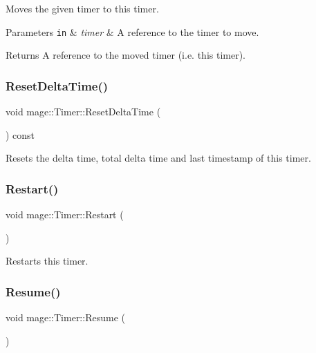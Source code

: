 Moves the given timer to this timer.


\begin{DoxyParams}[1]{Parameters}
\mbox{\tt in}  & {\em timer} & A reference to the timer to move. \\
\hline
\end{DoxyParams}
\begin{DoxyReturn}{Returns}
A reference to the moved timer (i.\+e. this timer). 
\end{DoxyReturn}
\hypertarget{classmage_1_1_timer_af9f185515128afd02ff36ac36f665552}{}\label{classmage_1_1_timer_af9f185515128afd02ff36ac36f665552} 
\subsubsection{\texorpdfstring{Reset\+Delta\+Time()}{ResetDeltaTime()}}
{\footnotesize\ttfamily void mage\+::\+Timer\+::\+Reset\+Delta\+Time (\begin{DoxyParamCaption}{ }\end{DoxyParamCaption}) const\hspace{0.3cm}{\ttfamily [private]}}

Resets the delta time, total delta time and last timestamp of this timer. \hypertarget{classmage_1_1_timer_a4e1ba19d02c290a18981db1766f006c3}{}\label{classmage_1_1_timer_a4e1ba19d02c290a18981db1766f006c3} 
\subsubsection{\texorpdfstring{Restart()}{Restart()}}
{\footnotesize\ttfamily void mage\+::\+Timer\+::\+Restart (\begin{DoxyParamCaption}{ }\end{DoxyParamCaption})}

Restarts this timer. \hypertarget{classmage_1_1_timer_a4d0e1c3bdeb93951c9332231be876d29}{}\label{classmage_1_1_timer_a4d0e1c3bdeb93951c9332231be876d29} 
\subsubsection{\texorpdfstring{Resume()}{Resume()}}
{\footnotesize\ttfamily void mage\+::\+Timer\+::\+Resume (\begin{DoxyParamCaption}{ }\end{DoxyParamCaption})}

